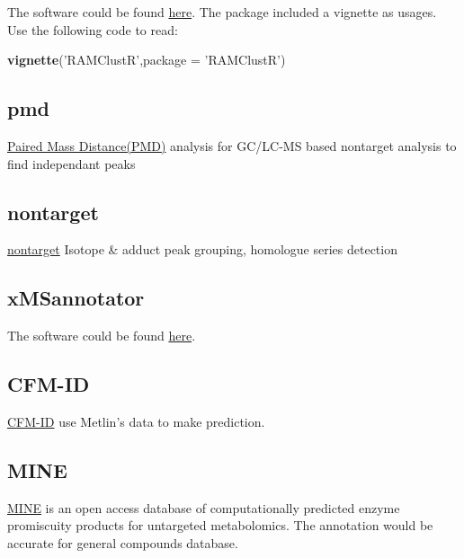 \documentclass[
]{book}
\newenvironment{Shaded}{\begin{snugshade}}{\end{snugshade}}
\newcommand{\DataTypeTok}[1]{\textcolor[rgb]{0.13,0.29,0.53}{#1}}
\newcommand{\KeywordTok}[1]{\textcolor[rgb]{0.13,0.29,0.53}{\textbf{#1}}}
\newcommand{\NormalTok}[1]{#1}
\newcommand{\StringTok}[1]{\textcolor[rgb]{0.31,0.60,0.02}{#1}}
\begin{document}
The software could be found \href{https://github.com/cbroeckl/RAMClustR}{here}\citep{broeckling2014}. The package included a vignette as usages. Use the following code to read:

\begin{Shaded}
\begin{Highlighting}[]
\KeywordTok{vignette}\NormalTok{(}\StringTok{'RAMClustR'}\NormalTok{,}\DataTypeTok{package =} \StringTok{'RAMClustR'}\NormalTok{)}
\end{Highlighting}
\end{Shaded}

\hypertarget{pmd}{%
\subsection{pmd}\label{pmd}}

\href{https://github.com/yufree/pmd}{Paired Mass Distance(PMD)} analysis for GC/LC-MS based nontarget analysis to find independant peaks\citep{yu2018}

\hypertarget{nontarget}{%
\subsection{nontarget}\label{nontarget}}

\href{https://github.com/blosloos/nontarget}{nontarget} Isotope \& adduct peak grouping, homologue series detection

\hypertarget{xmsannotator}{%
\subsection{xMSannotator}\label{xmsannotator}}

The software could be found \href{https://github.com/yufree/xMSannotator}{here}\citep{uppal2017}.

\hypertarget{cfm-id}{%
\subsection{CFM-ID}\label{cfm-id}}

\href{https://sourceforge.net/projects/cfm-id/}{CFM-ID} use Metlin's data to make prediction\citep{allen2014}.

\hypertarget{mine}{%
\subsection{MINE}\label{mine}}

\href{http://minedatabase.mcs.anl.gov/}{MINE} is an open access database of computationally predicted enzyme promiscuity products for untargeted metabolomics. The annotation would be accurate for general compounds database.
\end{document}
